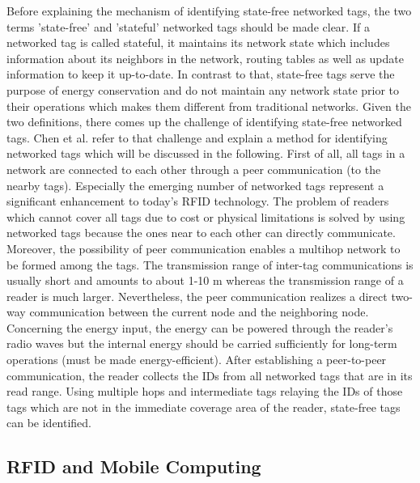 Before explaining the mechanism of identifying state-free networked tags, the two terms 'state-free' and 'stateful' networked tags should be made clear. If a networked tag is called stateful, it maintains its network state which includes information about its neighbors in the network, routing tables as well as update information to keep it up-to-date. In contrast to that, state-free tags serve the purpose of energy conservation and do not maintain any network state prior to their operations which makes them different from traditional networks. 
Given the two definitions, there comes up the challenge of identifying state-free networked tags. Chen et al. refer to that challenge and explain a method for identifying networked tags \cite[p.67 ff.]{chen} which will be discussed in the following. 
First of all, all tags in a network are connected to each other through a peer communication (to the nearby tags). Especially the emerging number of networked tags represent a significant enhancement to today's RFID technology. The problem of readers which cannot cover all tags due to cost or physical limitations is solved by using networked tags because the ones near to each other can directly communicate. Moreover, the possibility of peer communication enables a multihop network to be formed among the tags. The transmission range of inter-tag communications is usually short and amounts to about 1-10 m whereas the transmission range of a reader is much larger. 
Nevertheless, the peer communication realizes a direct two-way communication between the current node and the neighboring node. Concerning the energy input, the energy can be powered through the reader's radio waves but the internal energy should be carried sufficiently for long-term operations (must be made energy-efficient).
After establishing a peer-to-peer communication, the reader collects the IDs from all networked tags that are in its read range. Using multiple hops and intermediate tags relaying the IDs of those tags which are not in the immediate coverage area of the reader, state-free tags can be identified. 

\subsection{RFID and Mobile Computing}

